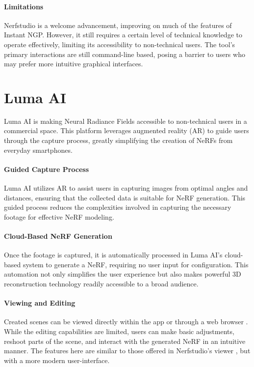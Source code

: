 \paragraph{Limitations}
Nerfstudio is a welcome advancement, improving on much of the features of Instant NGP. 
However, it still requires a certain level of technical knowledge to operate effectively, limiting its accessibility to non-technical users.
The tool's primary interactions are still command-line based, posing a barrier to users who may prefer more intuitive graphical interfaces.

\section{Luma AI}
\label{sec:related:luma}

Luma AI \cite{ai_luma_nodate} is making Neural Radiance Fields accessible to non-technical users in a commercial space.
This platform leverages augmented reality (AR) to guide users through the capture process, greatly simplifying the creation of NeRFs from everyday smartphones.

\paragraph{Guided Capture Process}
Luma AI utilizes AR to assist users in capturing images from optimal angles and distances, ensuring that the collected data is suitable for NeRF generation.
This guided process reduces the complexities involved in capturing the necessary footage for effective NeRF modeling.

\paragraph{Cloud-Based NeRF Generation}
Once the footage is captured, it is automatically processed in Luma AI’s cloud-based system to generate a NeRF, requiring no user input for configuration.
This automation not only simplifies the user experience but also makes powerful 3D reconstruction technology readily accessible to a broad audience.

\paragraph{Viewing and Editing}
Created scenes can be viewed directly within the app or through a web browser . 
While the editing capabilities are limited, users can make basic adjustments, reshoot parts of the scene, and interact with the generated NeRF in an intuitive manner.
The features here are similar to those offered in Nerfstudio's viewer , but with a more modern user-interface.

